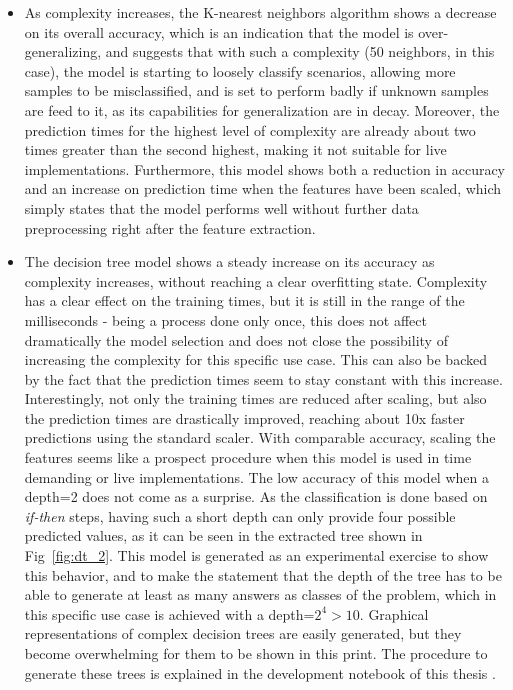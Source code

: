 \begin{itemize}
    \item As complexity increases, the K-nearest neighbors algorithm shows a decrease on its overall accuracy, which is an indication that the model is over-generalizing, and suggests that with such a complexity (50 neighbors, in this case), the model is starting to loosely classify scenarios, allowing more samples to be misclassified, and is set to perform badly if unknown samples are feed to it, as its capabilities for generalization are in decay. Moreover, the prediction times for the highest level of complexity are already about two times greater than the second highest, making it not suitable for live implementations. Furthermore, this model shows both a reduction in accuracy and an increase on prediction time when the features have been scaled, which simply states that the model performs well without further data preprocessing right after the feature extraction.
    \item The decision tree model shows a steady increase on its accuracy as complexity increases, without reaching a clear overfitting state. Complexity has a clear effect on the training times, but it is still in the range of the milliseconds - being a process done only once, this does not affect dramatically the model selection and does not close the possibility of increasing the complexity for this specific use case. This can also be backed by the fact that the prediction times seem to stay constant with this increase. Interestingly, not only the training times are reduced after scaling, but also the prediction times are drastically improved, reaching about 10x faster predictions using the standard scaler. With comparable accuracy, scaling the features seems like a prospect procedure when this model is used in time demanding or live implementations.
        The low accuracy of this model when a depth=2 does not come as a surprise. As the classification is done based on \emph{if-then} steps, having such a short depth can only provide four possible predicted values, as it can be seen in the extracted tree shown in Fig~\ref{fig:dt_2}. This model is generated as an experimental exercise to show this behavior, and to make the statement that the depth of the tree has to be able to generate at least as many answers as classes of the problem, which in this specific use case is achieved with a depth=\(2^4 > 10\). Graphical representations of complex decision trees are easily generated, but they become overwhelming for them to be shown in this print. The procedure to generate these trees is explained in the development notebook of this thesis \cite{repo:cognitive_radio_ml}.


\end{itemize}
